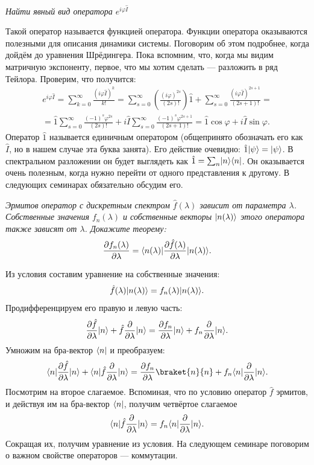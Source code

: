 \begin{exercise}
  \textit{Найти явный вид оператора $e^{i\varphi\hat I}$}
\end{exercise}
Такой оператор называется функцией оператора. Функции оператора оказываются
полезными для описания динамики системы. Поговорим об этом подробнее, когда
дойдём до уравнения Шрёдингера. Пока вспомним, что, когда мы видим матричную
экспоненту, первое, что мы хотим сделать --- разложить в ряд Тейлора. Проверим,
что получится:
\begin{gather*}
  e^{i\varphi\hat I} = \sum\limits_{k=0}^{\infty} \frac{(i\varphi\hat I)^k}{k!} = \sum\limits_{s=0}^{\infty} \left(\frac{(i\varphi)^{2s}}{(2s)!}\right) \hat 1 + \sum\limits_{s=0}^{\infty} \frac{(i\varphi\hat I)^{2s+1}}{(2s+1)!} = \\
  =\hat 1 \sum\limits_{s=0}^{\infty} \frac{(-1)^s\varphi^{2s}}{(2s)!} + i\hat I \sum\limits_{s=0}^{\infty} \frac{(-1)^{s}\varphi^{2s+1}}{(2s+1)!} = \hat 1 \cos\varphi + i\hat I \sin\varphi.
\end{gather*}
Оператор $\hat{1}$ называется единичным оператором (общепринято обозначать его
как $\hat{I}$, но в нашем случае эта буква занята). Его действие очевидно:
$\hat{1}\lvert\psi\rangle = \lvert\psi\rangle$. В спектральном разложении он будет выглядеть
как $\hat{1} = \sum_n \lvert n\rangle\langle n\rvert$. Он оказывается очень полезным, когда
нужно перейти от одного представления к другому. В следующих семинарах
обязательно обсудим его.
\qedsq
\begin{exercise}
  \textit{Эрмитов оператор с дискретным спектром $\hat f(\lambda)$ зависит от
    параметра $\lambda$. Собственные значения $f_n(\lambda)$ и собственные векторы
    $\lvert n(\lambda)\rangle$ этого оператора также зависят от $\lambda$. Докажите
    теорему:}
  \[
    \frac{\partial f_n(\lambda)}{\partial \lambda} = \langle n(\lambda)\rvert \frac{\partial \hat f(\lambda)}{\partial \lambda} \lvert n(\lambda)\rangle.
  \]
\end{exercise}

Из условия составим уравнение на собственные значения:
\[
  \hat f(\lambda)\lvert n(\lambda)\rangle = f_n(\lambda)\lvert n(\lambda)\rangle.
\]
Продифференцируем его правую и левую часть:
\[
  \frac{\partial \hat f}{\partial \lambda}\lvert n\rangle + \hat f\frac{\partial }{\partial \lambda}\lvert n\rangle = \frac{\partial f_n}{\partial \lambda}\lvert n\rangle + f_n\frac{\partial }{\partial \lambda}\lvert n\rangle.
\]
Умножим на бра-вектор $\langle n\rvert$ и преобразуем:
\[
  \bra{n}\pd{\hat f}{\lambda}\ket{n} + \bra{n}\hat f\pd{}{\lambda}\ket{n} = \pd{f_n}{\lambda}\braket{n}{n} + f_n\bra{n}\pd{}{\lambda}\ket{n}.
\]
Посмотрим на второе слагаемое. Вспоминая, что по условию оператор $\hat f$
эрмитов, и действуя им на бра-вектор $\langle n\rvert$, получим четвёртое слагаемое
\[
  \langle n\rvert\hat f\frac{\partial }{\partial \lambda}\lvert n\rangle = f_n\langle n\rvert\frac{\partial }{\partial \lambda}\lvert n\rangle.
\]
Сокращая их, получим уравнение из условия.
\qedsq
На следующем семинаре поговорим о важном свойстве операторов --- коммутации.
